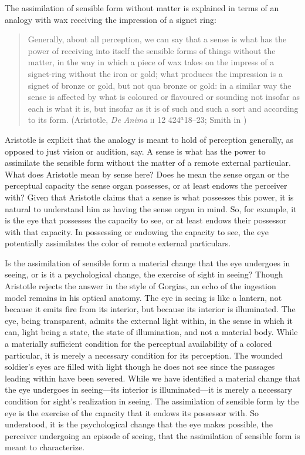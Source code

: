 The assimilation of sensible form without matter is explained in terms of an analogy with wax receiving the impression of a signet ring:
\begin{quote}
	Generally, about all perception, we can say that a sense is what has the power of receiving into itself the sensible forms of things without the matter, in the way in which a piece of wax takes on the impress of a signet-ring without the iron or gold; what produces the impression is a signet of bronze or gold, but not qua bronze or gold: in a similar way the sense is affected by what is coloured or flavoured or sounding not insofar as each is what it is, but insofar as it is of such and such a sort and according to its form. (Aristotle, \emph{De Anima} \textsc{ii} 12 424\( ^{a} \)18--23; Smith in \citealt[42--43]{Barnes:1984uq})
\end{quote}
Aristotle is explicit that the analogy is meant to hold of perception generally, as opposed to just vision or audition, say. A sense is what has the power to assimilate the sensible form without the matter of a remote external particular. What does Aristotle mean by sense here? Does he mean the sense organ or the perceptual capacity the sense organ possesses, or at least endows the perceiver with? Given that Aristotle claims that a sense is what possesses this power, it is natural to understand him as having the sense organ in mind. So, for example, it is the eye that possesses the capacity to see, or at least endows their possessor with that capacity. In possessing or endowing the capacity to see, the eye potentially assimilates the color of remote external particulars. 

Is the assimilation of sensible form a material change that the eye undergoes in seeing, or is it a psychological change, the exercise of sight in seeing? Though Aristotle rejects the answer in the style of Gorgias, an echo of the ingestion model remains in his optical anatomy. The eye in seeing is like a lantern, not because it emits fire from its interior, but because its interior is illuminated. The eye, being transparent, admits the external light within, in the sense in which it can, light being a state, the state of illumination, and not a material body. While a materially sufficient condition for the perceptual availability of a colored particular, it is merely a necessary condition for its perception. The wounded soldier's eyes are filled with light though he does not see since the passages leading within have been severed. While we have identified a material change that the eye undergoes in seeing---its interior is illuminated---it is merely a necessary condition for sight's realization in seeing. The assimilation of sensible form by the eye is the exercise of the capacity that it endows its possessor with. So understood, it is the psychological change that the eye makes possible, the perceiver undergoing an episode of seeing, that the assimilation of sensible form is meant to characterize.

